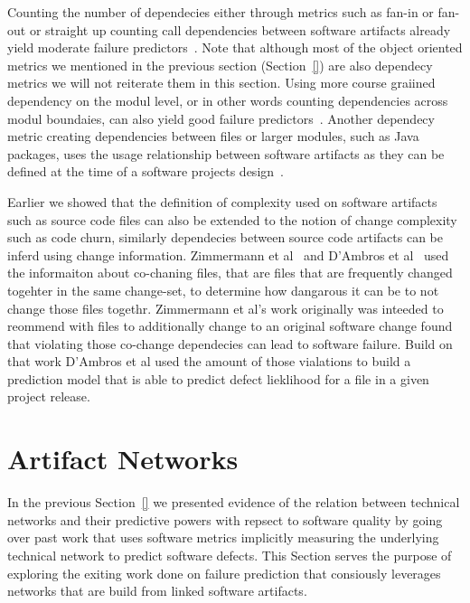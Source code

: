 Counting the number of dependecies either through metrics such as fan-in or fan-out or straight up counting call dependencies between software artifacts already yield moderate failure predictors~\cite{cataldo:icse:2011,nagappan:icse:2006,arisholm:isese:2006,knab:msr:2006,shin:msr:2006}.
Note that although most of the object oriented metrics we mentioned in the previous section (Section~\ref{}) are also dependecy metrics we will not reiterate them in this section. 
Using more course graiined dependency on the modul level, or in other words counting dependencies across modul boundaies, can also yield good failure predictors~\cite{jiang:promise:2008}.
Another dependecy metric creating dependencies between files or larger modules, such as Java packages, uses the usage relationship between software artifacts as they can be defined at the time of a software projects design~\cite{schoeter:isese:2006,dualaekoko:esem:2009}.

Earlier we showed that the definition of complexity used on software artifacts such as source code files can also be extended to the notion of change complexity such as code churn, similarly dependecies between source code artifacts can be inferd using change information.
Zimmermann et al~\cite{zimmermann:icse:2004} and D'Ambros et al~\cite{dambros:wcre:2009} used the informaiton about co-chaning files, that are files that are frequently changed togehter in the same change-set, to determine how dangarous it can be to not change those files togethr.
Zimmermann et al's work originally was inteeded to reommend with files to additionally change to an original software change  found that violating those co-change dependecies can lead to software failure.
Build on that work D'Ambros et al used the amount of those vialations to build a prediction model that is able to predict defect lieklihood for a file in a given project release. 


\section{Artifact Networks}
\label{chap:6:an}
In the previous Section~\ref{} we presented evidence of the relation between technical networks and their predictive powers with repsect to software quality by going over past work that uses software metrics implicitly measuring the underlying technical network to predict software defects.
This Section serves the purpose of exploring the exiting work done on failure prediction that consiously leverages networks that are build from linked software artifacts.

